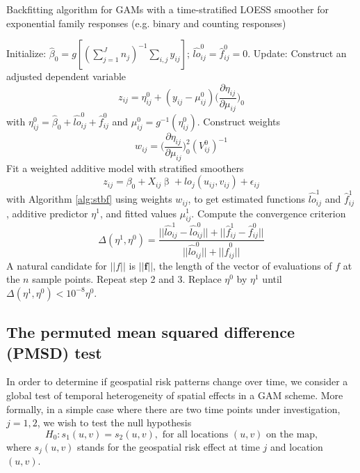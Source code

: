 	\begin{algorithm}[h]
		\caption{\linespread{1}\selectfont{} Backfitting algorithm for GAMs with a time-stratified LOESS smoother for exponential family responses (e.g. binary and counting responses)}
		\label{alg:stbfexp}
		\begin{algorithmic}[1]
			\State Initialize: $\hat{\beta}_0=g[(\sum_{j=1}^J n_j)^{-1}\sum_{i,j} y_{ij}]$; $\hat{lo}_{ij}^0=\hat{f}_{ij}^0=0$.
			\State Update: Construct an adjusted dependent variable
			$$
			z_{ij}=\eta_{ij}^0+(y_{ij}-\mu_{ij}^0)\Big(\frac{\partial \eta_{ij}}{\partial \mu_{ij}}\Big)_0
			$$
			with $\eta_{ij}^0=\hat{\beta}_0+\hat{lo}_{ij}^0+\hat{f}_{ij}^0$ and $\mu_{ij}^0=g^{-1}(\eta_{ij}^0)$.
			Construct weights
			$$
			w_{ij}=\Big(\frac{\partial \eta_{ij}}{\partial \mu_{ij}}\Big)_0^2(V_{ij}^0)^{-1}
			$$
			\State Fit a weighted additive model with stratified smoothers
			$$
			z_{ij}=\beta_0+X_{ij}\upbeta + lo_j(u_{ij},v_{ij})+\epsilon_{ij}
			$$
			with Algorithm \ref{alg:stbf} using weights $w_{ij}$, to get estimated functions $\hat{lo}_{ij}^1$ and $\hat{f}_{ij}^1$, additive predictor $\eta^1$, and fitted values $\mu_{ij}^1$. 
			Compute the convergence criterion 
			$$
			\Delta (\eta^1, \eta^0) =\frac{||\hat{lo}_{ij}^1-\hat{lo}_{ij}^0||+||\hat{f}_{ij}^1-\hat{f}_{ij}^0||}{||\hat{lo}_{ij}^0||+||\hat{f}_{ij}^0||}
			$$
			A natural candidate for $||f||$ is $||\textbf{f}||$, the length of the vector of evaluations of $f$ at the $n$ sample points.
			\State Repeat step 2 and 3.
			\State Replace $\eta^0$ by $\eta^1$ until $\Delta (\eta^1, \eta^0) < 10^{-8}\eta^0$.
		\end{algorithmic}
	\end{algorithm}
	
	\subsection{The permuted mean squared difference (PMSD) test}
	
	In order to determine if geospatial risk patterns change over time, we consider a global test of temporal heterogeneity of spatial effects in a GAM scheme. More formally, in a simple case where there are two time points under investigation, $j=1, 2$, we wish to test the null hypothesis
	\begin{equation}\label{H0_2sample}
	H_0: s_{1}(u,v)=s_{2}(u,v), \text{ for all locations $(u,v)$ on the map,}
	\end{equation}
	where $s_{j}(u,v)$ stands for the geospatial risk effect at time $j$ and location $(u,v)$. 
	
